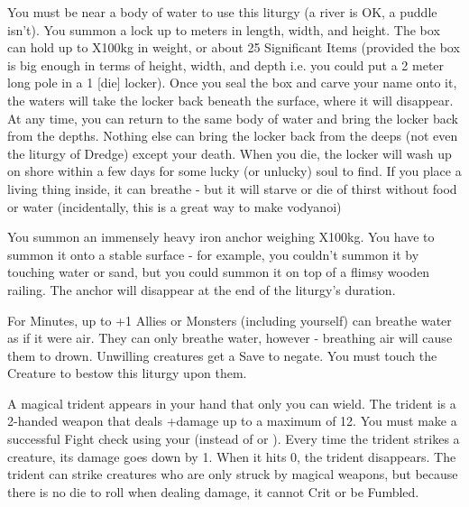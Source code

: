 {You must be near a body of water to use this liturgy (a river is OK, a puddle isn't).  You summon a lock up to \DICE meters in length, width, and height.  The box can hold up to \DICE X100kg in weight, or about 25 Significant Items (provided the box is big enough in terms of height, width, and depth i.e. you could put a 2 meter long pole in a 1 [die] locker).  Once you seal the box and carve your name onto it, the waters will take the locker back beneath the surface, where it will disappear.  At any time, you can return to the same body of water and bring the locker back from the depths. Nothing else can bring the locker back from the deeps (not even the liturgy of Dredge) except your death.  When you die, the locker will wash up on shore within a few days for some lucky (or unlucky) soul to find.
If you place a living thing inside, it can breathe - but it will starve or die of thirst without food or water (incidentally, this is a great way to make vodyanoi)
\LITURGY [
  Name= Iron Anchor,
  Link=ikitikbubuoe-liturgy-liturgy-iron-anchor,
  Paradigm= Force ,
  Save=  N ,
  Duration= \SUMDICE Minutes ,
  Counter=  n/a  ,
  Keywords= None ,
  Target=   Close (touch)
]



You summon an immensely heavy iron anchor weighing \DICE X100kg.  You have to summon it onto a stable surface - for example, you couldn't summon it by touching water or sand, but you could summon it on top of a flimsy wooden railing.  The anchor will disappear at the end of the liturgy's duration.
\LITURGY [
  Name= Mermaid's Breath,
  Link=ikitikbubuoe-liturgy-liturgy-mermaids-breath,
  Paradigm= Biomancy ,
  Save=  Y (negates) ,
  Duration= \SUMDICE Minutes ,
  Counter=  n/a  ,
  Keywords= Splittable ,
  Target=   Self / Close (touch)
]



For \SUMDICE Minutes, up to \DICE+1 Allies or Monsters (including yourself) can breathe water as if it were air.  They can only breathe water, however - breathing air will cause them to drown. Unwilling creatures get a Save to negate.  You must touch the Creature to bestow this liturgy upon them. 
\LITURGY [
  Name= Trident of Ik'tik'buboe,
  Link=ikitikbubuoe-liturgy-trident,
  Paradigm= Force ,
  Save=  N ,
  Duration= Session ,
  Counter=  n/a  ,
  Keywords= None ,
  Target=   Self
]



A magical trident appears in your hand that only you can wield.  The trident is a 2-handed weapon that deals \DICE+\DICE damage up to a maximum of 12. You must make a successful Fight check using your \FOC (instead of \VIG or \DEX). Every time the trident strikes a creature, its damage goes down by 1.  When it hits 0, the trident disappears.  The trident can strike creatures who are only struck by magical weapons, but because there is no die to roll when dealing damage, it cannot Crit or be Fumbled. 




}

